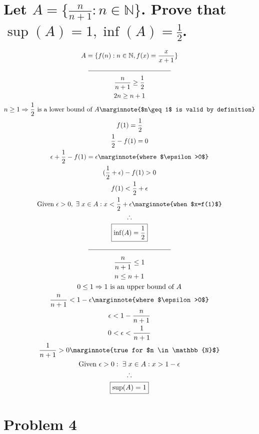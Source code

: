 \documentclass[letterpaper]{article}
\begin{document}
\section{Let $A=\{\frac{n}{n+1}:n\in\mathbb{N}\}$. Prove that $\sup(A)=1, \inf(A)=\frac{1}{2}$.}
\begin{gather*}
A=\{f(n):n\in\mathbb{N},f(x)=\frac{x}{x+1}\} \\
\line(1, 0){125} \\
\frac{n}{n+1}\geq\frac{1}{2} \\
2n\geq n+1 \\
n \geq 1 \Rightarrow \frac{1}{2} \text{ is a lower bound of } A \marginnote{$n\geq1$ is valid by definition} \\
f(1)=\frac{1}{2} \\
\frac{1}{2} - f(1) = 0 \\
\epsilon + \frac{1}{2} - f(1) = \epsilon \marginnote{where $\epsilon>0$} \\
(\frac{1}{2}+\epsilon) - f(1) > 0 \\
f(1)<\frac{1}{2}+\epsilon \\
\text{Given } \epsilon>0, \hspace{3pt} \exists \hspace{3pt} x \in A:x<\frac{1}{2}+\epsilon \marginnote{when $x=f(1)$} \\
\therefore \\
\boxed{\inf(A)=\frac{1}{2}} \\
\line(1, 0){125}
\end{gather*}
\begin{gather*}
\frac{n}{n+1}\leq1 \\
n\leq n+1 \\
0\leq1 \Rightarrow 1 \text{ is an upper bound of } A \\
\frac{n}{n+1} < 1-\epsilon \marginnote{where $\epsilon>0$} \\
\epsilon<1-\frac{n}{n+1} \\
0<\epsilon<\frac{1}{n+1} \\
\frac{1}{n+1}>0 \marginnote{true for $n \in \mathbb{N}$} \\
\text{Given } \epsilon>0: \hspace{3pt} \exists \hspace{3pt} x \in A:x>1-\epsilon  \\
\therefore \\
\boxed{\sup(A)=1}
\end{gather*}

\section{Problem 4}
\end{document}
